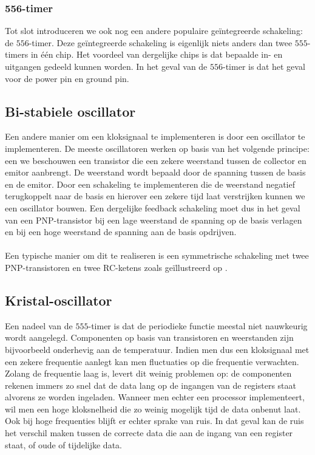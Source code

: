 \subsubsection{556-timer}
Tot slot introduceren we ook nog een andere populaire ge\"integreerde schakeling: de $556$-timer. Deze ge\"integreerde schakeling is eigenlijk niets anders dan twee $555$-timers in \'e\'en chip. Het voordeel van dergelijke chips is dat bepaalde in- en uitgangen gedeeld kunnen worden. In het geval van de $556$-timer is dat het geval voor de power pin en ground pin.
\subsection{Bi-stabiele oscillator}
Een andere manier om een kloksignaal te implementeren is door een oscillator te implementeren. De meeste oscillatoren werken op basis van het volgende principe: een we beschouwen een transistor die een zekere weerstand tussen de collector en emitor aanbrengt. De weerstand wordt bepaald door de spanning tussen de basis en de emitor. Door een schakeling te implementeren die de weerstand negatief terugkoppelt naar de basis en hierover een zekere tijd laat verstrijken kunnen we een oscillator bouwen. Een dergelijke feedback schakeling moet dus in het geval van een PNP-transistor bij een lage weerstand de spanning op de basis verlagen en bij een hoge weerstand de spanning aan de basis opdrijven.
\paragraph{}
Een typische manier om dit te realiseren is een symmetrische schakeling met twee PNP-transistoren en twee RC-ketens zoals ge\"illustreerd op .
\subsection{Kristal-oscillator}
Een nadeel van de $555$-timer is dat de periodieke functie meestal niet nauwkeurig wordt aangelegd. Componenten op basis van transistoren en weerstanden zijn bijvoorbeeld onderhevig aan de temperatuur. Indien men dus een kloksignaal met een zekere frequentie aanlegt kan men fluctuaties op die frequentie verwachten. Zolang de frequentie laag is, levert dit weinig problemen op: de componenten rekenen immers zo snel dat de data lang op de ingangen van de registers staat alvorens ze worden ingeladen. Wanneer men echter een processor implementeert, wil men een hoge kloksnelheid die zo weinig mogelijk tijd de data onbenut laat. Ook bij hoge frequenties blijft er echter sprake van ruis. In dat geval kan de ruis het verschil maken tussen de correcte data die aan de ingang van een register staat, of oude of tijdelijke data.
